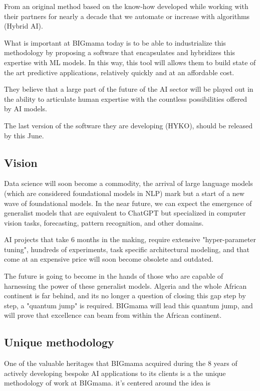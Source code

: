\documentclass[a4paper,12pt]{article}
\begin{document}
From an original method based on the know-how developed while working with their partners for nearly a decade that we automate or increase with algorithms (Hybrid AI).

What is important at BIGmama today is to be able to industrialize this methodology by proposing a software that encapsulates and hybridizes this expertise with ML models. In this way, this tool will allows them to build state of the art predictive applications, relatively quickly and at an affordable cost.

They believe that a large part of the future of the AI sector will be played out in the ability to articulate human expertise with the countless possibilities offered by AI models.

The last version of the software they are developing (HYKO), should be released by this June.

\subsection{Vision}
Data science will soon become a commodity, the arrival of large language models (which are considered foundational models in NLP) mark but a start of a new wave of foundational models. In the near future, we can expect the emergence of generalist models that are equivalent to ChatGPT but specialized in computer vision tasks, forecasting, pattern recognition, and other domains.

AI projects that take 6 months in the making, require extensive "hyper-parameter tuning", hundreds of experiments, task specific architectural modeling, and that come at an expensive price will soon become obsolete and outdated.

The future is going to become in the hands of those who are capable of harnessing the power of these generalist models. Algeria and the whole African continent is far behind, and its no longer a question of closing this gap step by step, a "quantum jump" is required. BIGmama will lead this quantum jump, and will prove that excellence can beam from within the African continent. 

\subsection{Unique methodology}
One of the valuable heritages that BIGmama acquired during the 8 years of actively developing bespoke AI applications to its clients is a the unique methodology of work at BIGmama. it's centered around the idea is 
\end{document}

